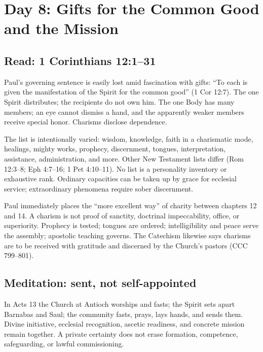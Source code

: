 \section{Day 8: Gifts for the Common Good and the Mission}


\subsection{Read: 1 Corinthians 12:1--31}

Paul's governing sentence is easily lost amid fascination with gifts: “To each is given the manifestation of the Spirit for the common good” (1 Cor 12:7). The one Spirit distributes; the recipients do not own him. The one Body has many members; an eye cannot dismiss a hand, and the apparently weaker members receive special honor. Charisms disclose dependence.

The list is intentionally varied: wisdom, knowledge, faith in a charismatic mode, healings, mighty works, prophecy, discernment, tongues, interpretation, assistance, administration, and more. Other New Testament lists differ (Rom 12:3--8; Eph 4:7--16; 1 Pet 4:10--11). No list is a personality inventory or exhaustive rank. Ordinary capacities can be taken up by grace for ecclesial service; extraordinary phenomena require sober discernment.

Paul immediately places the “more excellent way” of charity between chapters 12 and 14. A charism is not proof of sanctity, doctrinal impeccability, office, or superiority. Prophecy is tested; tongues are ordered; intelligibility and peace serve the assembly; apostolic teaching governs. The Catechism likewise says charisms are to be received with gratitude and discerned by the Church's pastors (CCC 799--801).

\subsection{Meditation: sent, not self-appointed}

In Acts 13 the Church at Antioch worships and fasts; the Spirit sets apart Barnabas and Saul; the community fasts, prays, lays hands, and sends them. Divine initiative, ecclesial recognition, ascetic readiness, and concrete mission remain together. A private certainty does not erase formation, competence, safeguarding, or lawful commissioning.

